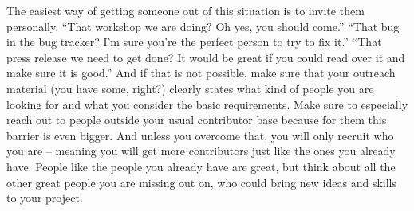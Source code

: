 The easiest way of getting someone out of this situation is to invite
them personally. ``That workshop we are doing? Oh yes, you should
come.'' ``That bug in the bug tracker? I'm sure you're the perfect
person to try to fix it.'' ``That press release we need to get done?
It would be great if you could read over it and make sure it is
good.'' And if that is not possible, make sure that your outreach
material (you have some, right?) clearly states what kind of people
you are looking for and what you consider the basic requirements. Make
sure to especially reach out to people outside your usual contributor
base because for them this barrier is even bigger. And unless you
overcome that, you will only recruit who you are -- meaning you will
get more contributors just like the ones you already have. People like
the people you already have are great, but think about all the other
great people you are missing out on, who could bring new ideas and
skills to your project.
